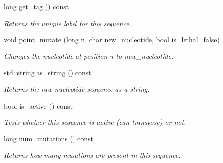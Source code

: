 \begin{DoxyCompactItemize}
\mbox{\label{classrcombinator_1_1Sequence_a5690b6b125807696c81533e7be0be296}} 
long \mbox{\hyperlink{classrcombinator_1_1Sequence_a5690b6b125807696c81533e7be0be296}{get\+\_\+tag}} () const
\begin{DoxyCompactList}\small\item\em Returns the unique label for this sequence. \end{DoxyCompactList}\item 
void \mbox{\hyperlink{classrcombinator_1_1Sequence_a5f7bccd4725bb8c46f6b93bd01a6b2f0}{point\+\_\+mutate}} (long n, char new\+\_\+nucleotide, bool is\+\_\+lethal=false)
\begin{DoxyCompactList}\small\item\em Changes the nucleotide at position {\itshape n} to {\itshape new\+\_\+nucleotide}. \end{DoxyCompactList}\item 
\mbox{\label{classrcombinator_1_1Sequence_a5fa45e155a1e4b3c257f19369ace05a8}} 
std\+::string \mbox{\hyperlink{classrcombinator_1_1Sequence_a5fa45e155a1e4b3c257f19369ace05a8}{as\+\_\+string}} () const
\begin{DoxyCompactList}\small\item\em Returns the raw nucleotide sequence as a string. \end{DoxyCompactList}\item 
bool \mbox{\hyperlink{classrcombinator_1_1Sequence_a5af66ddd3c8bc05307b56737c56060bf}{is\+\_\+active}} () const
\begin{DoxyCompactList}\small\item\em Tests whether this sequence is active (can transpose) or not. \end{DoxyCompactList}\item 
\mbox{\label{classrcombinator_1_1Sequence_a821299743e342f028cf7cff51289e3cf}} 
long \mbox{\hyperlink{classrcombinator_1_1Sequence_a821299743e342f028cf7cff51289e3cf}{num\+\_\+mutations}} () const
\begin{DoxyCompactList}\small\item\em Returns how many mutations are present in this sequence. \end{DoxyCompactList}\end{DoxyCompactItemize}
